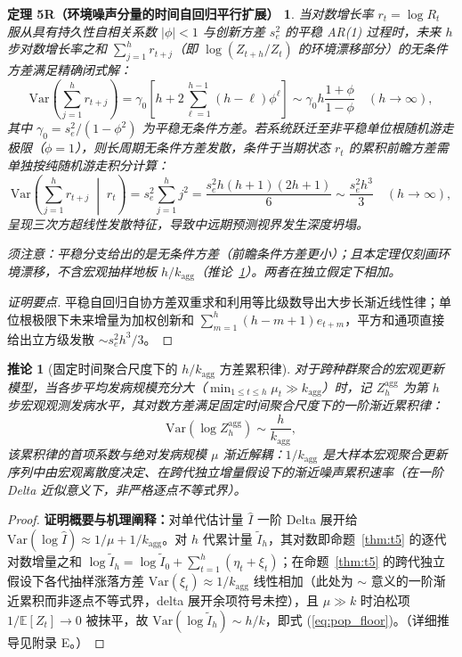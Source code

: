 \documentclass[11pt,a4paper]{article}
\theoremstyle{plain}
\newtheorem*{theorem5R}{定理 5R（环境噪声分量的时间自回归平行扩展）}
\newtheorem{corollary}{推论}
\theoremstyle{definition}
\begin{document}
\begin{theorem5R}\label{thm:t5r}
当对数增长率 $r_t = \log R_t$ 服从具有持久性自相关系数 $|\phi| < 1$ 与创新方差 $s_e^2$ 的平稳 AR(1) 过程时，未来 $h$ 步对数增长率之和 $\sum_{j=1}^h r_{t+j}$（即 $\log(Z_{t+h}/Z_t)$ 的环境漂移部分）的无条件方差满足精确闭式解：
\begin{equation}
\text{Var}\left(\sum_{j=1}^h r_{t+j}\right) = \gamma_0 \left[ h + 2 \sum_{\ell=1}^{h-1} (h-\ell) \phi^\ell \right] \sim \gamma_0 h \frac{1+\phi}{1-\phi} \quad (h \to \infty),
\end{equation}
其中 $\gamma_0 = s_e^2/(1-\phi^2)$ 为平稳无条件方差。若系统跃迁至非平稳单位根随机游走极限（$\phi = 1$），则长周期无条件方差发散，条件于当期状态 $r_t$ 的累积前瞻方差需单独按纯随机游走积分计算：
\begin{equation}
\text{Var}\left(\sum_{j=1}^h r_{t+j} \;\middle|\; r_t\right) = s_e^2 \sum_{j=1}^h j^2 = \frac{s_e^2 h(h+1)(2h+1)}{6} \sim \frac{s_e^2 h^3}{3} \quad (h \to \infty),
\end{equation}
呈现三次方超线性发散特征，导致中远期预测视界发生深度坍塌。

须注意：平稳分支给出的是无条件方差（前瞻条件方差更小）；且本定理仅刻画环境漂移，不含宏观抽样地板 $h/k_{\text{agg}}$（推论~\ref{cor:pop_floor}）。两者在独立假定下相加。
\end{theorem5R}

\begin{proof}[证明要点]
平稳自回归自协方差双重求和利用等比级数导出大步长渐近线性律；单位根极限下未来增量为加权创新和 $\sum_{m=1}^h (h-m+1)e_{t+m}$，平方和通项直接给出立方级发散 $\sim s_e^2 h^3/3$。
\end{proof}

\begin{corollary}[固定时间聚合尺度下的 $h/k_{\text{agg}}$ 方差累积律]\label{cor:pop_floor}
对于跨种群聚合的宏观更新模型，当各步平均发病规模充分大（$\min_{1 \le t \le h} \mu_t \gg k_{\text{agg}}$）时，记 $Z_h^{\text{agg}}$ 为第 $h$ 步宏观观测发病水平，其对数方差满足固定时间聚合尺度下的一阶渐近累积律：
\begin{equation}
\text{Var}(\log Z_h^{\text{agg}}) \sim \frac{h}{k_{\text{agg}}},
\label{eq:pop_floor}
\end{equation}
该累积律的首项系数与绝对发病规模 $\mu$ 渐近解耦：$1/k_{\text{agg}}$ 是大样本宏观聚合更新序列中由宏观离散度决定、在跨代独立增量假设下的渐近噪声累积速率（在一阶 Delta 近似意义下，非严格逐点不等式界）。
\end{corollary}

\begin{proof}
\textbf{证明概要与机理阐释：}对单代估计量 $\hat{I}$ 一阶 Delta 展开给 $\text{Var}(\log\hat{I}) \approx 1/\mu + 1/k_{\text{agg}}$。对 $h$ 代累计量 $\tilde{I}_h$，其对数即命题~\ref{thm:t5} 的逐代对数增量之和 $\log\tilde{I}_h = \log \tilde{I}_0 + \sum_{t=1}^{h}(\eta_t + \xi_t)$；在命题~\ref{thm:t5} 的跨代独立假设下各代抽样涨落方差 $\text{Var}(\xi_t)\approx 1/k_{\text{agg}}$ 线性相加（此处为 $\sim$ 意义的一阶渐近累积而非逐点不等式界，delta 展开余项符号未控），且 $\mu \gg k$ 时泊松项 $1/\mathbb{E}[Z_t] \to 0$ 被抹平，故 $\text{Var}(\log\tilde{I}_h) \sim h/k$，即式 (\ref{eq:pop_floor})。（详细推导见附录 E。）
\end{proof}
\end{document}
